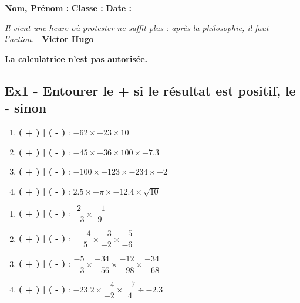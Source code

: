 \documentclass[12pt]{article}
\begin{document}

\textbf{Nom, Prénom :} \hspace{8cm} \textbf{Classe :} \hspace{3cm} \textbf{Date :}

\begin{center}
  \textit{Il vient une heure où protester ne suffit plus : après la philosophie, il faut l’action.}  - \textbf{Victor Hugo}

\end{center}

\textbf{La calculatrice n'est pas autorisée.}

\subsection*{Ex1 - Entourer le + si le résultat est positif, le - sinon}

\begin{multicols}{2}
  
  \begin{enumerate}
  \item[] \textbf{( + ) | ( - )} : $ -62 \times -23 \times 10$\\
  \item[] \textbf{( + ) | ( - )} : $ -45 \times -36 \times 100 \times -7.3$\\
  \item[] \textbf{( + ) | ( - )} : $ -100 \times -123 \times -234 \times -2$\\
  \item[] \textbf{( + ) | ( - )} : $ 2.5 \times -\pi \times -12.4 \times \sqrt{10}$\\
  \end{enumerate}

  \begin{enumerate}
  \item[] \textbf{( + ) | ( - )} :  $ \dfrac{2}{-3} \times \dfrac{-1}{9} $ \\
  \item[] \textbf{( + ) | ( - )} :  $ - \dfrac{-4}{5} \times \dfrac{-3}{-2} \times \dfrac{-5}{-6}$ \\
  \item[] \textbf{( + ) | ( - )} :  $ \dfrac{-5}{-3} \times \dfrac{-34}{-56} \times \dfrac{-12}{-98} \times  \dfrac{-34}{-68} $ \\
  \item[] \textbf{( + ) | ( - )} :  $ -23.2 \times \dfrac{-4}{-2} \times \dfrac{-7}{4} \div -2.3$ \\
  \end{enumerate}

\end{multicols}
\end{document}
